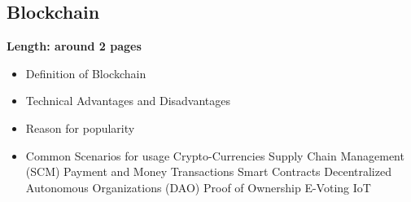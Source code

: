 \subsection{Blockchain}

\textbf{Length: around 2 pages}

\begin{itemize}
  \item Definition of Blockchain
  \item Technical Advantages and Disadvantages
  \item Reason for popularity
  \item Common Scenarios for usage
  \subitem Crypto-Currencies
  \subitem Supply Chain Management (SCM)
  \subitem Payment and Money Transactions
  \subitem Smart Contracts
  \subitem Decentralized Autonomous Organizations (DAO)
  \subitem Proof of Ownership
  \subitem E-Voting
   \subitem IoT

\end{itemize}
